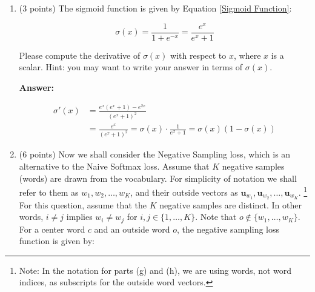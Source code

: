 \documentclass{article}
\newenvironment{answer}{
    {\bf Answer:} \sf \begingroup\color{red}
}{\endgroup}%
\begin{document}
\begin{enumerate}[label=(\alph*)]
Please compute the derivative of $f(x)$ with respect to $x$, where $x$ is a scalar. You may ignore the case that the derivative is not defined at 0.\footnote{If you're interested in how to handle the derivative at this point, you can read more about the notion of \hyperref[https://en.wikipedia.org/wiki/Subderivative]{subderivatives}.}

\begin{shaded}
\begin{answer}

\begin{equation*}
    f'(x) =
    \begin{cases}
        1 & \text{($x \geq 0$)} \\
        0 & \text{($x < 0$)}
    \end{cases}
\end{equation*}

\end{answer}
\end{shaded}

\item (3 points) The sigmoid function is given by Equation \ref{Sigmoid Function}:

\begin{equation}
    \label{Sigmoid Function}
    \sigma (x) = \frac{1}{1 + e^{-x}} = \frac{e^{x}}{e^{x} + 1}
\end{equation}

Please compute the derivative of $\sigma(x)$ with respect to $x$, where $x$ is a scalar. Hint: you may want to write your answer in terms of $\sigma(x)$.

\begin{shaded}
\begin{answer}

\begin{align*}
    \sigma '(x)
    &= \frac{e^x (e^x + 1) - e^{2x}}{(e^x + 1)^2} \\
    &= \frac{e^x}{(e^x + 1)^2} = \sigma (x) \cdot \frac{1}{e^x + 1} = \sigma (x) (1 - \sigma (x))
\end{align*}

\end{answer}
\end{shaded}

\item (6 points) Now we shall consider the Negative Sampling loss, which is an alternative to the Naive Softmax loss.  Assume that $K$ negative samples (words) are drawn from the vocabulary. For simplicity of notation we shall refer to them as $w_1, w_2, \dots, w_K$, and their outside vectors as $\bm u_{w_1}, \bm u_{w_2}, \dots, \bm u_{w_K}$. \footnote{Note: In the notation for parts (g) and (h), we are using words, not word indices, as subscripts for the outside word vectors.} For this question, assume that the $K$ negative samples are distinct. In other words, $i\neq j$ implies $w_i\neq w_j$ for $i,j\in\{1,\dots,K\}$.
Note that $o\notin\{w_1, \dots, w_K\}$. 
For a center word $c$ and an outside word $o$, the negative sampling loss function is given by:


\end{enumerate}
\end{document}
